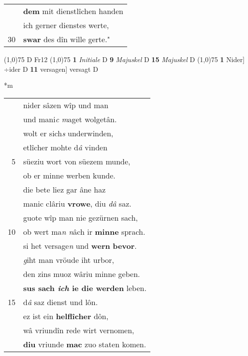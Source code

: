 \documentclass[8pt,a4paper,notitlepage]{article}
\begin{document}
\begin{table}[ht]
\begin{minipage}[t]{0.5\linewidth}
\begin{tabular}{rl}
 & \textbf{dem} mit dienstlîchen handen\\ 
 & ich gerner dienstes werte,\\ 
30 & \textbf{swar} des dîn wille gerte."\\ 
\end{tabular}
\scriptsize
\line(1,0){75} \newline
D Fr12 \newline
\line(1,0){75} \newline
\textbf{1} \textit{Initiale} D  \textbf{9} \textit{Majuskel} D  \textbf{15} \textit{Majuskel} D  \newline
\line(1,0){75} \newline
\textbf{1} Nider] ÷ider D \textbf{11} versagen] versagt D \newline
\end{minipage}
\hspace{0.5cm}
\begin{minipage}[t]{0.5\linewidth}
\small
\begin{center}*m
\end{center}
\begin{tabular}{rl}
 & nider sâzen wîp und man\\ 
 & und mani\textit{c} \textit{m}aget wolgetân.\\ 
 & wolt er sich\textit{s} underwinden,\\ 
 & etlîcher mohte d\textit{â} vinden\\ 
5 & süeziu wort von süezem munde,\\ 
 & ob er minne werben kunde.\\ 
 & die bete liez gar âne haz\\ 
 & manic clâriu \textbf{vrowe}, diu \textit{dâ} saz.\\ 
 & guote wîp man nie gezürnen sach,\\ 
10 & ob wert ma\textit{n n}âch ir \textbf{minne} sprach.\\ 
 & si het versage\textit{n} und \textbf{wern} \textbf{bevor}.\\ 
 & \textit{g}iht man vröude iht urbor,\\ 
 & den zins muoz wâriu minne geben.\\ 
 & \textbf{sus sach \textit{ich} ie die werden} leben.\\ 
15 & d\textit{â} saz dienst und lôn.\\ 
 & ez ist ein \textbf{helflîcher} dôn,\\ 
 & wâ vriundîn rede wirt vernomen,\\ 
 & \textbf{diu} vriunde \textbf{mac} zuo staten komen.\\ 

\end{tabular}
\end{minipage}
\end{table}
\end{document}
